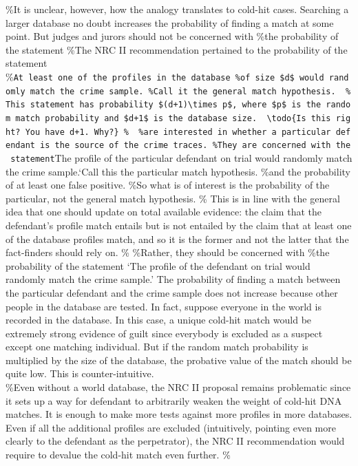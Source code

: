 \documentclass[10pt,dvipsnames,enabledeprecatedfontcommands]{scrartcl}
\begin{document}
\%It is unclear, however, how the analogy translates to cold-hit cases.
Searching a larger database no doubt increases the probability of
finding a match at some point. But judges and jurors should not be
concerned with \%the probability of the statement \%The NRC II
recommendation pertained to the probability of the statement
\%\texttt{At\ least\ one\ of\ the\ profiles\ in\ the\ database\ \%of\ size\ \$d\$\ would\ randomly\ match\ the\ crime\ sample.\textquotesingle{}\ \%Call\ it\ the\ general\ match\ hypothesis.\ \ \%This\ statement\ has\ probability\ \$(d+1)\textbackslash{}times\ p\$,\ where\ \$p\$\ is\ the\ random\ match\ probability\ and\ \$d+1\$\ is\ the\ database\ size.\ \ \textbackslash{}todo\{Is\ this\ right?\ You\ have\ d+1.\ Why?\}\ \%\ \ \%are\ interested\ in\ whether\ a\ particular\ defendant\ is\ the\ source\ of\ the\ crime\ traces.\ \%They\ are\ concerned\ with\ the\ statement}The
profile of the particular defendant on trial would randomly match the
crime sample.`Call this the particular match hypothesis. \%and the
probability of at least one false positive. \%So what is of interest is
the probability of the particular, not the general match hypothesis. \%
This is in line with the general idea that one should update on total
available evidence: the claim that the defendant's profile match entails
but is not entailed by the claim that at least one of the database
profiles match, and so it is the former and not the latter that the
fact-finders should rely on. \% \%Rather, they should be concerned with
\%the probability of the statement `The profile of the defendant on
trial would randomly match the crime sample.' The probability of finding
a match between the particular defendant and the crime sample does not
increase because other people in the database are tested. In fact,
suppose everyone in the world is recorded in the database. In this case,
a unique cold-hit match would be extremely strong evidence of guilt
since everybody is excluded as a suspect except one matching individual.
But if the random match probability is multiplied by the size of the
database, the probative value of the match should be quite low. This is
counter-intuitive.\\
\%Even without a world database, the NRC II proposal remains problematic
since it sets up a way for defendant to arbitrarily weaken the weight of
cold-hit DNA matches. It is enough to make more tests against more
profiles in more databases. Even if all the additional profiles are
excluded (intuitively, pointing even more clearly to the defendant as
the perpetrator), the NRC II recommendation would require to devalue the
cold-hit match even further. \%
\end{document}
